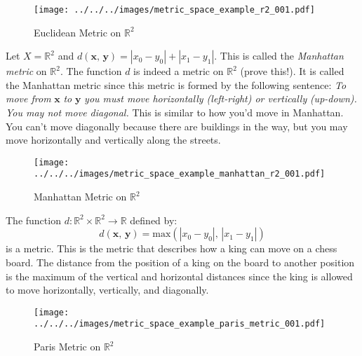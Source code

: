 \documentclass{article}
\theoremstyle{plain}
\theoremstyle{normal}
\newenvironment{example}{%
    \pushQED{\qed}\renewcommand{\qedsymbol}{$\blacksquare$}\examplex%
}{%
    \popQED\endexamplex%
}
\begin{document}
        \begin{figure}
            \centering
            \texttt{[image: ../../../images/metric\_space\_example\_r2\_001.pdf]}
            \caption{Euclidean Metric on $\mathbb{R}^{2}$}
            \label{fig:metric_space_example_r2_001}
        \end{figure}
        \begin{example}
            Let $X=\mathbb{R}^{2}$ and
            $d(\mathbf{x},\,\mathbf{y})=|x_{0}-y_{0}|+|x_{1}-y_{1}|$. This is
            called the \textit{Manhattan metric} on $\mathbb{R}^{2}$.
            The function $d$ is indeed a metric on $\mathbb{R}^{2}$
            (prove this!). It is called the Manhattan metric since this metric
            is formed by the following sentence:
            \textit{To move from} $\mathbf{x}$ \textit{to} $\mathbf{y}$
            \textit{you must move horizontally (left-right) or vertically}
            \textit{(up-down). You may not move diagonal.}
            This is similar to how you'd move in Manhattan. You
            can't move diagonally because there are buildings in the way,
            but you may move horizontally and vertically along the streets.
        \end{example}
        \begin{figure}
            \centering
            \texttt{[image: ../../../images/metric\_space\_example\_manhattan\_r2\_001.pdf]}
            \caption{Manhattan Metric on $\mathbb{R}^{2}$}
            \label{fig:metric_space_example_manhattan_r2_001}
        \end{figure}
        \begin{example}
            The function $d:\mathbb{R}^{2}\times\mathbb{R}^{2}\rightarrow\mathbb{R}$
            defined by:
            \begin{equation}
                d(\mathbf{x},\,\mathbf{y})=
                \textrm{max}(|x_{0}-y_{0}|,\,|x_{1}-y_{1}|)
            \end{equation}
            is a metric. This is the metric that describes how a king can move
            on a chess board. The distance from the position of a king on the
            board to another position is the maximum of the vertical and
            horizontal distances since the king is allowed to move horizontally,
            vertically, and diagonally.
        \end{example}
        \begin{figure}
            \centering
            \texttt{[image: ../../../images/metric\_space\_example\_paris\_metric\_001.pdf]}
            \caption{Paris Metric on $\mathbb{R}^{2}$}
            \label{fig:metric_space_example_paris_metric_001}
        \end{figure}
\end{document}
